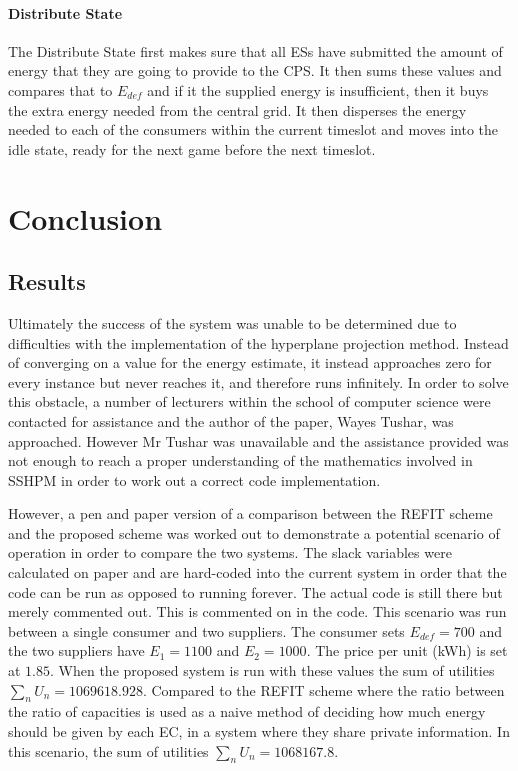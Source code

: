 \documentclass[a4paper, notitlepage]{report}
\begin{document}
\subsection{Distribute State}
\label{sec:orgad307c1}
The Distribute State first makes sure that all ESs have submitted the amount of
energy that they are going to provide to the CPS. It then sums these values and
compares that to \(E_{def}\) and if it the supplied energy is insufficient, then it
buys the extra energy needed from the central grid. It then disperses the energy
needed to each of the consumers within the current timeslot and moves into the
idle state, ready for the next game before the next timeslot.
\part{Conclusion}
\label{sec:org2fcffb7}
\chapter{Results}
\label{sec:org869dade}
Ultimately the success of the system was unable to be determined due to
difficulties with the implementation of the hyperplane projection method.
Instead of converging on a value for the energy estimate, it instead approaches
zero for every instance but never reaches it, and therefore runs infinitely. In
order to solve this obstacle, a number of lecturers within the school of
computer science were contacted for assistance and the author of the paper,
Wayes Tushar, was approached. However Mr Tushar was unavailable and the
assistance provided was not enough to reach a proper understanding of the
mathematics involved in SSHPM in order to work out a correct code
implementation. 

However, a pen and paper version of a comparison between the REFIT scheme and
the proposed scheme was worked out to demonstrate a potential scenario of
operation in order to compare the two systems. The slack variables were
calculated on paper and are hard-coded into the current system in order that the
code can be run as opposed to running forever. The actual code is still there
but merely commented out. This is commented on in the code. This scenario was
run between a single consumer and two suppliers. The consumer sets \(E_{def}= 700\)
and the two suppliers have \(E_{1} = 1100\) and \(E_{2} = 1000\). The price per unit (kWh)
is set at \(1.85\). When the proposed system is run with these values the sum of
utilities \(\sum_{n} U_n = 1069618.928\). Compared to the REFIT scheme where the ratio
between the ratio of capacities is used as a naive method of deciding how much
energy should be given by each EC, in a system where they share private
information. In this scenario, the sum of utilities \(\sum_{n} U_n = 1068167.8\).
\end{document}
